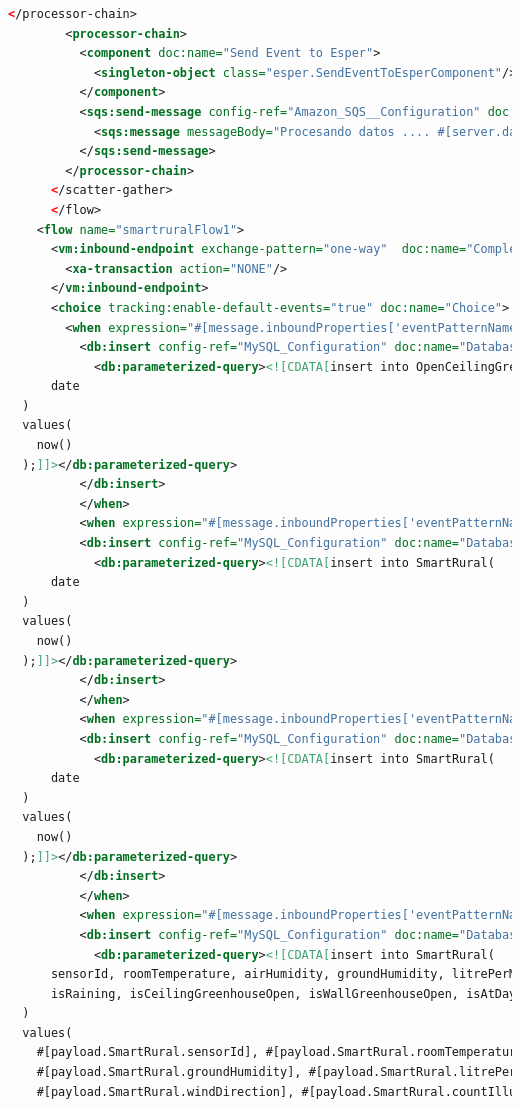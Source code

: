 \documentclass[a4paper,12pt]{article}
\begin{document}
\begin{lstlisting}[language=xml,caption=smart-rural.xml]
        </processor-chain>
        <processor-chain>
          <component doc:name="Send Event to Esper">
            <singleton-object class="esper.SendEventToEsperComponent"/>
          </component>
          <sqs:send-message config-ref="Amazon_SQS__Configuration" doc:name="Amazon SQS">
            <sqs:message messageBody="Procesando datos .... #[server.dateTime]"/>
          </sqs:send-message>
        </processor-chain>
      </scatter-gather>
      </flow>
    <flow name="smartruralFlow1">
      <vm:inbound-endpoint exchange-pattern="one-way"  doc:name="Complex Event Consumer" ref="ComplexEventConsumerGlobalVM">
        <xa-transaction action="NONE"/>
      </vm:inbound-endpoint>
      <choice tracking:enable-default-events="true" doc:name="Choice">
        <when expression="#[message.inboundProperties['eventPatternName'] == 'OpenCeilingGreenHouse']" >
          <db:insert config-ref="MySQL_Configuration" doc:name="Database">
            <db:parameterized-query><![CDATA[insert into OpenCeilingGreenHouse(
      date
  )
  values(
    now()
  );]]></db:parameterized-query>
          </db:insert>
          </when>
          <when expression="#[message.inboundProperties['eventPatternName'] == 'Irrigate']" >
          <db:insert config-ref="MySQL_Configuration" doc:name="Database">
            <db:parameterized-query><![CDATA[insert into SmartRural(
      date
  )
  values(
    now()
  );]]></db:parameterized-query>
          </db:insert>
          </when>
          <when expression="#[message.inboundProperties['eventPatternName'] == 'CanFertilizer']" >
          <db:insert config-ref="MySQL_Configuration" doc:name="Database">
            <db:parameterized-query><![CDATA[insert into SmartRural(
      date
  )
  values(
    now()
  );]]></db:parameterized-query>
          </db:insert>
          </when>
          <when expression="#[message.inboundProperties['eventPatternName'] == 'CanOpenWallGreenhouse']" >
          <db:insert config-ref="MySQL_Configuration" doc:name="Database">
            <db:parameterized-query><![CDATA[insert into SmartRural(
      sensorId, roomTemperature, airHumidity, groundHumidity, litrePerMeterWater, windForce, windDirection, countIllumination,
      isRaining, isCeilingGreenhouseOpen, isWallGreenhouseOpen, isAtDaytime, canPhotosynthesisImprove
  )
  values(
    #[payload.SmartRural.sensorId], #[payload.SmartRural.roomTemperature], #[payload.SmartRural.airHumidity],
    #[payload.SmartRural.groundHumidity], #[payload.SmartRural.litrePerMeterWater], #[payload.SmartRural.windForce],
    #[payload.SmartRural.windDirection], #[payload.SmartRural.countIllumination], #[payload.SmartRural.isRaining],

\end{lstlisting}
\end{document}

